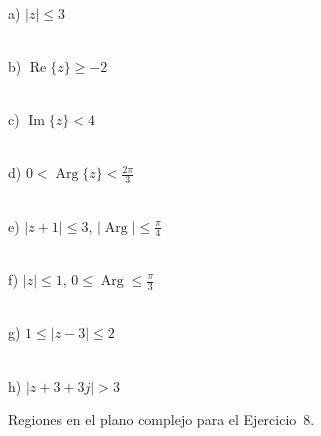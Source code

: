 \documentclass[10pt,a4paper]{article}
\begin{document}
\begin{figure}[H]
	\centering
	\begin{minipage}{\linewidth}
		\centering
		\begin{minipage}[t]{0.23\linewidth}
			\centering
			\\[1pt]
			{\scriptsize a) $|z|\leq 3$}
		\end{minipage}\hfill
		\begin{minipage}[t]{0.23\linewidth}
			\centering
			\\[1pt]
			{\scriptsize b) $\operatorname{Re}\{z\}\geq{-2}$}
		\end{minipage}\hfill
		\begin{minipage}[t]{0.23\linewidth}
			\centering
			\\[1pt]
			{\scriptsize c) $\operatorname{Im}\{z\}<4$}
		\end{minipage}\hfill
		\begin{minipage}[t]{0.23\linewidth}
			\centering
			\\[1pt]
			{\scriptsize d) $0<\operatorname{Arg}\{z\}<\tfrac{2\pi}{3}$}
		\end{minipage}

		\vspace{0.5em}

		\begin{minipage}[t]{0.23\linewidth}
			\centering
			\\[1pt]
			{\scriptsize e) $|z{+}1|\leq3$, $|\operatorname{Arg}|\leq\tfrac{\pi}{4}$}
		\end{minipage}\hfill
		\begin{minipage}[t]{0.23\linewidth}
			\centering
			\\[1pt]
			{\scriptsize f) $|z|\leq1$, $0\leq\operatorname{Arg}\leq\tfrac{\pi}{3}$}
		\end{minipage}\hfill
		\begin{minipage}[t]{0.23\linewidth}
			\centering
			\\[1pt]
			{\scriptsize g) $1\leq|z-3|\leq2$}
		\end{minipage}\hfill
		\begin{minipage}[t]{0.23\linewidth}
			\centering
			\\[1pt]
			{\scriptsize h) $|z{+}3{+}3j|>3$}
		\end{minipage}

		\caption{Regiones en el plano complejo para el Ejercicio~8.}
		\label{fig:ejer8}
	\end{minipage}
\end{figure}
\end{document}

